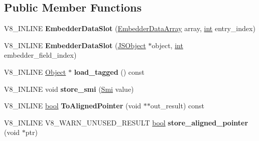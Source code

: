\subsection*{Public Member Functions}
\begin{DoxyCompactItemize}
\item 
\mbox{\label{classv8_1_1internal_1_1EmbedderDataSlot_a86da6ecded93b49e83c8a1fb1843706e}} 
V8\+\_\+\+I\+N\+L\+I\+NE {\bfseries Embedder\+Data\+Slot} (\mbox{\hyperlink{classv8_1_1internal_1_1EmbedderDataArray}{Embedder\+Data\+Array}} array, \mbox{\hyperlink{classint}{int}} entry\+\_\+index)
\item 
\mbox{\label{classv8_1_1internal_1_1EmbedderDataSlot_addbd5d6903151ae20836ea6ecbfc1f28}} 
V8\+\_\+\+I\+N\+L\+I\+NE {\bfseries Embedder\+Data\+Slot} (\mbox{\hyperlink{classv8_1_1internal_1_1JSObject}{J\+S\+Object}} $\ast$object, \mbox{\hyperlink{classint}{int}} embedder\+\_\+field\+\_\+index)
\item 
\mbox{\label{classv8_1_1internal_1_1EmbedderDataSlot_a4feb2b20852c53418a41c106f7a17fc7}} 
V8\+\_\+\+I\+N\+L\+I\+NE \mbox{\hyperlink{classv8_1_1internal_1_1Object}{Object}} $\ast$ {\bfseries load\+\_\+tagged} () const
\item 
\mbox{\label{classv8_1_1internal_1_1EmbedderDataSlot_a2b7cf0fc284f959592a421743ba628e7}} 
V8\+\_\+\+I\+N\+L\+I\+NE void {\bfseries store\+\_\+smi} (\mbox{\hyperlink{classv8_1_1internal_1_1Smi}{Smi}} value)
\item 
\mbox{\label{classv8_1_1internal_1_1EmbedderDataSlot_a196d87591f3deea73b2c34f28c2edae0}} 
V8\+\_\+\+I\+N\+L\+I\+NE \mbox{\hyperlink{classbool}{bool}} {\bfseries To\+Aligned\+Pointer} (void $\ast$$\ast$out\+\_\+result) const
\item 
\mbox{\label{classv8_1_1internal_1_1EmbedderDataSlot_af56e16c668e8e09d9e8d3a0b8f2781a9}} 
V8\+\_\+\+I\+N\+L\+I\+NE V8\+\_\+\+W\+A\+R\+N\+\_\+\+U\+N\+U\+S\+E\+D\+\_\+\+R\+E\+S\+U\+LT \mbox{\hyperlink{classbool}{bool}} {\bfseries store\+\_\+aligned\+\_\+pointer} (void $\ast$ptr)
\item 
$$
\end{DoxyCompactItemize}
